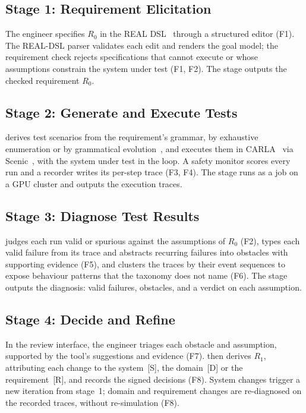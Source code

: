 \subsection{Stage 1: Requirement Elicitation}
\label{sec:elicit}
The engineer specifies $R_0$ in the REAL DSL~\cite{real2026} through a
structured editor (F1). The REAL-DSL parser validates each edit and renders the
goal model; the requirement check rejects specifications that \tool{} cannot
execute or whose assumptions constrain the system under test (F1, F2). The stage
outputs the checked requirement $R_0$.

\subsection{Stage 2: Generate and Execute Tests}
\label{sec:generate}
\tool{} derives test scenarios from the requirement's grammar, by exhaustive
enumeration or by grammatical evolution~\cite{oneill2001,grape2022}, and
executes them in CARLA~\cite{carla2017} via Scenic~\cite{scenic2023}, with the
system under test in the loop. A safety monitor scores every run and a recorder
writes its per-step trace (F3, F4). The stage runs as a job on a GPU cluster
and outputs the execution traces.

\subsection{Stage 3: Diagnose Test Results}
\label{sec:diagnose}
\tool{} judges each run valid or spurious against the assumptions of $R_0$
(F2), types each valid failure from its trace and abstracts recurring failures
into obstacles with supporting evidence (F5), and clusters the traces by their
event sequences to expose behaviour patterns that the taxonomy does not name
(F6). The stage outputs the diagnosis:
valid failures, obstacles, and a verdict on each assumption.

\subsection{Stage 4: Decide and Refine}
\label{sec:decide}
In the review interface, the engineer triages each obstacle and assumption,
supported by the tool's suggestions and evidence (F7). \tool{} then derives
$R_1$, attributing each change to the system~[S], the domain~[D] or the
requirement~[R], and records the signed decisions (F8). System changes trigger
a new iteration from stage~1; domain and requirement changes are re-diagnosed on
the recorded traces, without re-simulation (F8).

